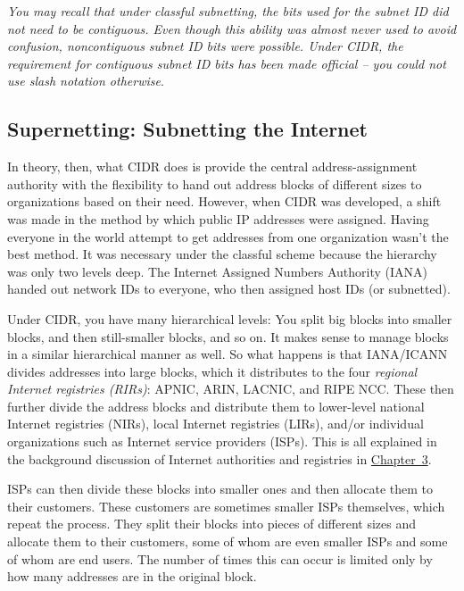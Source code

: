 \documentclass[b5paper,11pt]{memoir}
\begin{document}
{\emph{You may recall that under classful subnetting, the bits used for
the subnet ID did not need to be contiguous. Even though this ability
was almost never used to avoid confusion, noncontiguous subnet ID bits
were possible. Under CIDR, the requirement for contiguous subnet ID bits
has been made official -- you could not use slash notation otherwise}}.

\subsection[Supernetting: Subnetting the
Internet]{\texorpdfstring{\protect\hypertarget{ch20s02.htmlux5cux23supernetting_subnetting_the_internet}{}{}Supernetting:
Subnetting the Internet}{Supernetting: Subnetting the Internet}}

In theory, then, what CIDR does is provide the central
address-assignment authority with the flexibility to hand out address
blocks of different sizes to organizations based on their need. However,
when CIDR was developed, a shift was made in the method by which public
IP addresses were assigned. Having everyone in the world attempt to get
addresses from one organization wasn't the best method. It was necessary
under the classful scheme because the hierarchy was only two levels
deep. The Internet Assigned Numbers Authority (IANA) handed out network
IDs to everyone, who then assigned host IDs (or subnetted).

Under CIDR, you have many hierarchical levels: You split big blocks into
smaller blocks, and then still-smaller blocks, and so on. It makes sense
to manage blocks in a similar hierarchical manner as well. So what
happens is that
\protect\hypertarget{ch20s02.htmlux5cux23idx-CHP-20-0768}{}{}IANA/ICANN
divides addresses into large blocks, which it distributes to the four
\protect\hypertarget{ch20s02.htmlux5cux23idx-CHP-20-0769}{}{}{\emph{regional
Internet registries (RIRs)}}: APNIC, ARIN, LACNIC, and RIPE NCC. These
then further divide the address blocks and distribute them to
lower-level national Internet registries (NIRs), local Internet
registries (LIRs), and/or individual organizations such as Internet
service providers (ISPs). This is all explained in the background
discussion of Internet authorities and registries in
\protect\hyperlink{ch03.html}{Chapter~3}.

ISPs can then divide these blocks into smaller ones and then allocate
them to their customers. These customers are sometimes smaller ISPs
themselves, which repeat the process. They split their blocks into
pieces of different sizes and allocate them to their customers, some of
whom are even smaller ISPs and some of whom are end users. The number of
times this can occur is limited only by how many addresses are in the
original block.
\end{document}
